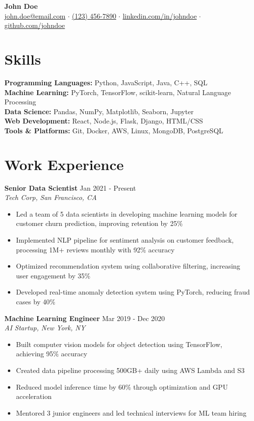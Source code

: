 \documentclass[11pt]{article}
\begin{document}
\begin{center}
    {\Large\bfseries John Doe}\\
    \vspace{0.1in}
    \href{mailto:john.doe@email.com}{john.doe@email.com} $\cdot$
    \href{tel:+1234567890}{(123) 456-7890} $\cdot$
    \href{https://linkedin.com/in/johndoe}{linkedin.com/in/johndoe} $\cdot$
    \href{https://github.com/johndoe}{github.com/johndoe}
\end{center}

\section*{Skills}
\textbf{Programming Languages:} Python, JavaScript, Java, C++, SQL\\
\textbf{Machine Learning:} PyTorch, TensorFlow, scikit-learn, Natural Language Processing\\
\textbf{Data Science:} Pandas, NumPy, Matplotlib, Seaborn, Jupyter\\
\textbf{Web Development:} React, Node.js, Flask, Django, HTML/CSS\\
\textbf{Tools \& Platforms:} Git, Docker, AWS, Linux, MongoDB, PostgreSQL

\section*{Work Experience}
\textbf{Senior Data Scientist} \hfill Jan 2021 - Present\\
\textit{Tech Corp, San Francisco, CA}
\begin{itemize}[leftmargin=*]
    \item Led a team of 5 data scientists in developing machine learning models for customer churn prediction, improving retention by 25\%
    \item Implemented NLP pipeline for sentiment analysis on customer feedback, processing 1M+ reviews monthly with 92\% accuracy
    \item Optimized recommendation system using collaborative filtering, increasing user engagement by 35\%
    \item Developed real-time anomaly detection system using PyTorch, reducing fraud cases by 40\%
\end{itemize}

\textbf{Machine Learning Engineer} \hfill Mar 2019 - Dec 2020\\
\textit{AI Startup, New York, NY}
\begin{itemize}[leftmargin=*]
    \item Built computer vision models for object detection using TensorFlow, achieving 95\% accuracy
    \item Created data pipeline processing 500GB+ daily using AWS Lambda and S3
    \item Reduced model inference time by 60\% through optimization and GPU acceleration
    \item Mentored 3 junior engineers and led technical interviews for ML team hiring
\end{itemize}
\end{document}
